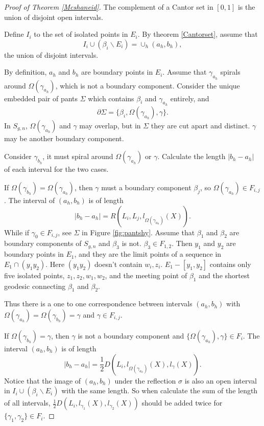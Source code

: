 \begin{proof}[Proof of Theorem \ref{Mcshaneid}]
The complement of a Cantor set in $[0,1]$ is the  union of 
disjoint open intervals.

Define $I_i$  to the set of isolated points in $E_i$. By theorem \ref{Cantorset}, assume that $$
I_i\cup (\beta_i\backslash E_i)=\cup_{h}(a_h,b_h),
$$
 the union of disjoint intervals.  
 
 By definition, $a_h$ and $b_h$ are boundary points in $E_i$.
Assume that $\gamma_{a_h}$ spirals around $\Omega(\gamma_{a_h})$, which is not a boundary component.  Consider  the unique embedded pair of pants $\Sigma$ which contains $\beta_i$ and $\gamma_{a_h}$ entirely, and $$
\partial \Sigma=\{\beta_i,\Omega(\gamma_{a_h}),\gamma\}.
$$
In $S_{g,n}$, $\Omega(\gamma_{a_h})$ and $\gamma$ may overlap, but in $\Sigma$ they are cut apart and distinct. $\gamma$ may be another boundary component. 

Consider $\gamma_{b_h}$, it must spiral around $\Omega(\gamma_{a_h})$ or $\gamma$. Calculate  the length  $|b_h-a_h|$ of each interval for the two cases.

If $\Omega(\gamma_{b_h})=\Omega(\gamma_{a_h})$, then $\gamma$ must  a boundary component $\beta_j$, so $\Omega(\gamma_{a_h})\in F_{i,j}$. The interval of $(a_h,b_h)$  is of length $$ |b_h-a_h|=R(L_i,L_j,l_{\Omega(\gamma_{a_h})}(X)).$$
While if $\gamma_0\in F_{i,j}$, see $\Sigma$ in Figure \ref{fig:pantshy}. Assume  that $\beta_1$ and $\beta_2$ are boundary components of $S_{g,n}$ and $\beta_3$ is not. $\beta_3\in F_{1,2}$. Then $y_1$ and $y_2$ are boundary points in $E_1$, and they are  the limit points of a sequence in $E_1\cap (y_1y_2)$. Here $(y_1y_2)$ doesn't contain $w_i,z_i$. $E_1-[y_1,y_2]$ contains only five isolated points, $z_1,z_2,w_1,w_2$, and the meeting point of $\beta_1$ and the shortest geodesic connecting $\beta_1$ and $\beta_2$. 
 
Thus there is a one to one correspondence between intervals $(a_h,b_h)$ with $\Omega(\gamma_{a_h})=\Omega(\gamma_{b_h})=\gamma$ and $\gamma\in F_{i,j}$.


If $\Omega(\gamma_{b_h})=\gamma$, then $\gamma$ is not a boundary component and $\{\Omega(\gamma_{a_h}),\gamma\}\in F_i$. The interval $(a_h,b_h)$ is of length $$|b_h-a_h|=\frac{1}{2}D(L_i,l_{\Omega(\gamma_{a_h})}(X),l_{\gamma}(X)).$$ 
Notice that the image of $(a_h,b_h)$ under the reflection  $\sigma$ is also an open interval in $I_i\cup (\beta_i\backslash E_i)$ with the same length. So when calculate the sum of the length of all intervals, $\frac{1}{2}D(L_i,l_{\gamma_1}(X),l_{\gamma_2}(X))$ should be added twice  for $\{\gamma_1,\gamma_2\}\in F_i$.


\end{proof}
